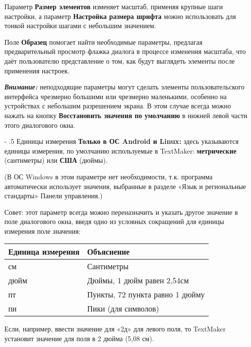 ﻿\documentclass[a4paper,10pt]{article}
\makeatletter
\renewcommand\paragraph{%
   \@startsection{paragraph}{4}{0mm}%
      {-\baselineskip}%
      {.5\baselineskip}%
      {\normalfont\normalsize\bfseries}}
\makeatother
\begin{document}
Параметр \textbf{Размер элементов} изменяет масштаб, применяя крупные шаги настройки, а параметр \textbf{Настройка размера шрифта} можно использовать для тонкой настройки шагами с небольшим значением. 

Поле \textbf{Образец} помогает найти необходимые параметры, предлагая предварительный просмотр флажка диалога в процессе изменения масштаба, что даёт пользователю представление о том, как будут выглядеть элементы после применения настроек.

\begin{mdframed}[backgroundcolor=blue!10]
\textbf{\textit{Внимание:}} неподходящие параметры могут сделать элементы пользовательского интерфейса чрезмерно большими или чрезмерно маленькими, особенно на устройствах с небольшим разрешением экрана. В этом случае всегда можно нажать на кнопку \textbf{Восстановить значения по умолчанию} в нижней левой части этого диалогового окна.
\end{mdframed}

\paragraph{Единицы измерения}
\textbf{Только в ОС Android и Linux:} здесь указываются единицы измерения, по умолчанию используемые в TextMaker: \textbf{метрические} (сантиметры) или \textbf{США} (дюймы).

(В ОС Windows в этом параметре нет необходимости, т.к. программа автоматически использует значения, выбранные в разделе «Язык и региональные стандарты» Панели управления.)

Совет: этот параметр всегда можно переназначить и указать другое значение в поле диалогового окна, введя одно из условных сокращений для единицы измерения поле значения:


\begin{tabular}{ | m{4cm} | m{6cm} | }
\hline
 \textbf{Единица измерения} & \textbf{Объяснение} \\ 
 \hline
 см & Сантиметры\\
\hline
дюйм & Дюймы, 1 дюйм равен 2,54см\\
\hline
пт & Пункты, 72 пункта равно 1 дюйму \\
\hline
пи & Пики (для символов)\\
\hline
\end{tabular}

Если, например, ввести значение для «2д» для левого поля, то TextMaker установит значение для поля в 2 дюйма (5,08 см).
\end{document}
